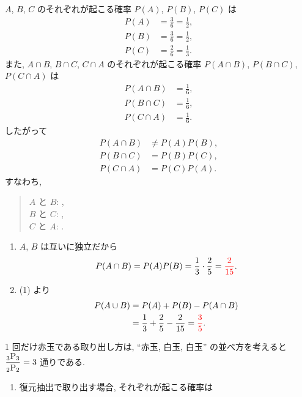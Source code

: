 \begin{qenumerate}
{\begin{enumerate}
{				$A$, $B$, $C$ のそれぞれが起こる確率 $P(A)$, $P(B)$, $P(C)$ は
				\begin{align}
					P(A) &= \frac{3}{6} = \frac{1}{2}, \\
					P(B) &= \frac{3}{6} = \frac{1}{2}, \\
					P(C) &= \frac{2}{6} = \frac{1}{3}.
				\end{align}
				また, $A\cap B$, $B\cap C$, $C\cap A$ のそれぞれが起こる確率 $P(A\cap B)$, $P(B\cap C)$, $P(C\cap A)$ は
				\begin{align}
					P(A\cap B) &= \frac{1}{6}, \\
					P(B\cap C) &= \frac{1}{6}, \\
					P(C\cap A) &= \frac{1}{6}.
				\end{align}
				したがって
				\begin{align}
					P(A\cap B) &\neq P(A)P(B), \\
					P(B\cap C) &= P(B)P(C), \\
					P(C\cap A) &= P(C)P(A).
				\end{align}
				すなわち,
				\begin{quote}
					$A$ と $B$: , \\
					$B$ と $C$: , \\
					$C$ と $A$: .
				\end{quote}
				}
		\end{enumerate}
	}
	\item{
		\begin{enumerate}
			\item{
				$A$, $B$ は互いに独立だから
				\begin{align}
					P(A\cap B) = P(A)P(B) = \frac{1}{3}\cdot\frac{2}{5} = \textcolor{red}{\frac{2}{15}}.
				\end{align}
			}
			\item{
				(1) より
				\begin{align}
					P(A\cup B) &= P(A) + P(B) - P(A\cap B) \\
						&= \frac{1}{3} + \frac{2}{5} - \frac{2}{15} = \textcolor{red}{\frac{3}{5}}.
				\end{align}
			}
		\end{enumerate}
	}
	\item{
		1 回だけ赤玉である取り出し方は, ``赤玉, 白玉, 白玉'' の並べ方を考えると $\dfrac{{{}_{3}\mathrm{P}_{3}}}{{{}_{2}\mathrm{P}_{2}}} = 3$ 通りである.
		\begin{enumerate}
			\item{
				復元抽出で取り出す場合, それぞれが起こる確率は
}
\end{enumerate}}
\end{qenumerate}
